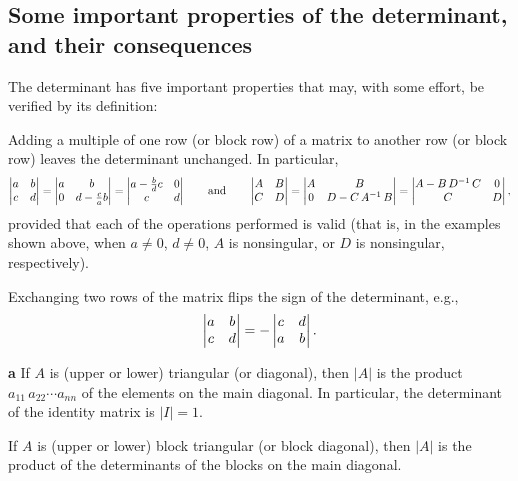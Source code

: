 \subsection{Some important properties of the determinant, and their consequences}\label{sec.A.B.A}

\noindent The determinant has five important properties that may, with
some effort, be verified by its definition: \vskip0.1in

\begin{property} Adding a multiple of one row (or block row) of a matrix to another
row (or block row) leaves the determinant unchanged.  In particular,
\begin{equation*}
\left|\begin{matrix} a & b \cr c & d \end{matrix}\right| =
\left|\begin{matrix} a & b \cr 0 & d-\frac{c}{a}b\end{matrix}\right|=
\left|\begin{matrix} a-\frac{b}{d}c & 0 \cr c & d\end{matrix}\right|\qquad \textrm{and} \qquad
\left|\begin{matrix} A & B \cr C & D \end{matrix}\right| =
\left|\begin{matrix} A & B \cr 0 & D-C\,A^{-1}\,B\end{matrix}\right|=
\left|\begin{matrix} A-B\,D^{-1}\,C & 0 \cr C & D\end{matrix}\right|,
\end{equation*}
provided that each of the operations performed is valid (that is, in
the examples shown above, when $a\ne 0$, $d\ne 0$, $A$ is nonsingular,
or $D$ is nonsingular, respectively).
\end{property}

\begin{property} Exchanging two rows of the matrix flips the sign of
the determinant, e.g.,
\begin{equation*}
  \left|\begin{matrix}a & b \cr c & d\end{matrix}\right| = -
  \left|\begin{matrix}c & d \cr a & b\end{matrix}\right|.
\end{equation*}\vskip-0.06in
\end{property} 
    
\begin{property}\hskip-0.065in {\bf a} If $A$ is (upper or lower)
triangular (or diagonal), then $|A|$ is the product
$a_{11}\,a_{22}\cdots a_{nn}$ of the elements on the main diagonal.
In particular, the determinant of the identity matrix is $|I|=1$.

 If $A$ is (upper or lower) block
triangular (or block diagonal), then $|A|$ is the product of the
determinants of the blocks on the main diagonal.
\end{property} 

